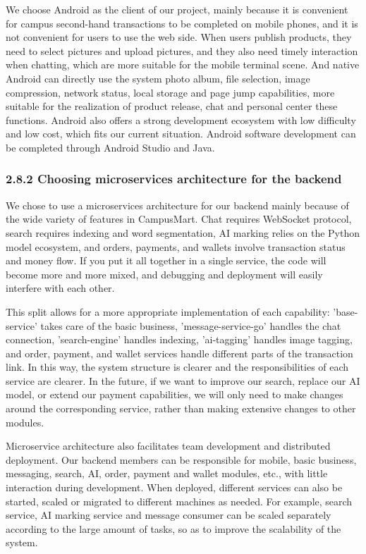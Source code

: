 \documentclass{article}
\begin{document}
We choose Android as the client of our project, mainly because it is convenient for campus second-hand transactions to be completed on mobile phones, and it is not convenient for users to use the web side. When users publish products, they need to select pictures and upload pictures, and they also need timely interaction when chatting, which are more suitable for the mobile terminal scene. And native Android can directly use the system photo album, file selection, image compression, network status, local storage and page jump capabilities, more suitable for the realization of product release, chat and personal center these functions. Android also offers a strong development ecosystem with low difficulty and low cost, which fits our current situation. Android software development can be completed through Android Studio and Java.

\subsubsection{2.8.2 Choosing microservices architecture for the backend}

We chose to use a microservices architecture for our backend mainly because of the wide variety of features in CampusMart. Chat requires WebSocket protocol, search requires indexing and word segmentation, AI marking relies on the Python model ecosystem, and orders, payments, and wallets involve transaction status and money flow. If you put it all together in a single service, the code will become more and more mixed, and debugging and deployment will easily interfere with each other.

This split allows for a more appropriate implementation of each capability: 'base-service' takes care of the basic business, 'message-service-go' handles the chat connection, 'search-engine' handles indexing, 'ai-tagging' handles image tagging, and order, payment, and wallet services handle different parts of the transaction link. In this way, the system structure is clearer and the responsibilities of each service are clearer. In the future, if we want to improve our search, replace our AI model, or extend our payment capabilities, we will only need to make changes around the corresponding service, rather than making extensive changes to other modules.

Microservice architecture also facilitates team development and distributed deployment. Our backend members can be responsible for mobile, basic business, messaging, search, AI, order, payment and wallet modules, etc., with little interaction during development. When deployed, different services can also be started, scaled or migrated to different machines as needed. For example, search service, AI marking service and message consumer can be scaled separately according to the large amount of tasks, so as to improve the scalability of the system.
\end{document}
